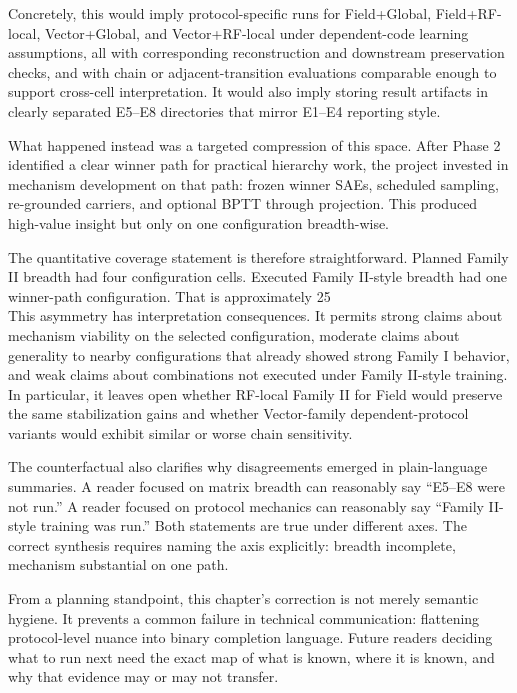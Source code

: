 \documentclass[11pt]{article}
\begin{document}
Concretely, this would imply protocol-specific runs for Field+Global, Field+RF-local, Vector+Global, and Vector+RF-local under dependent-code learning assumptions, all with corresponding reconstruction and downstream preservation checks, and with chain or adjacent-transition evaluations comparable enough to support cross-cell interpretation. It would also imply storing result artifacts in clearly separated E5--E8 directories that mirror E1--E4 reporting style.

What happened instead was a targeted compression of this space. After Phase 2 identified a clear winner path for practical hierarchy work, the project invested in mechanism development on that path: frozen winner SAEs, scheduled sampling, re-grounded carriers, and optional BPTT through projection. This produced high-value insight but only on one configuration breadth-wise.

The quantitative coverage statement is therefore straightforward. Planned Family II breadth had four configuration cells. Executed Family II-style breadth had one winner-path configuration. That is approximately 25\\%

This asymmetry has interpretation consequences. It permits strong claims about mechanism viability on the selected configuration, moderate claims about generality to nearby configurations that already showed strong Family I behavior, and weak claims about combinations not executed under Family II-style training. In particular, it leaves open whether RF-local Family II for Field would preserve the same stabilization gains and whether Vector-family dependent-protocol variants would exhibit similar or worse chain sensitivity.

The counterfactual also clarifies why disagreements emerged in plain-language summaries. A reader focused on matrix breadth can reasonably say ``E5--E8 were not run.'' A reader focused on protocol mechanics can reasonably say ``Family II-style training was run.'' Both statements are true under different axes. The correct synthesis requires naming the axis explicitly: breadth incomplete, mechanism substantial on one path.

From a planning standpoint, this chapter's correction is not merely semantic hygiene. It prevents a common failure in technical communication: flattening protocol-level nuance into binary completion language. Future readers deciding what to run next need the exact map of what is known, where it is known, and why that evidence may or may not transfer.
\end{document}
